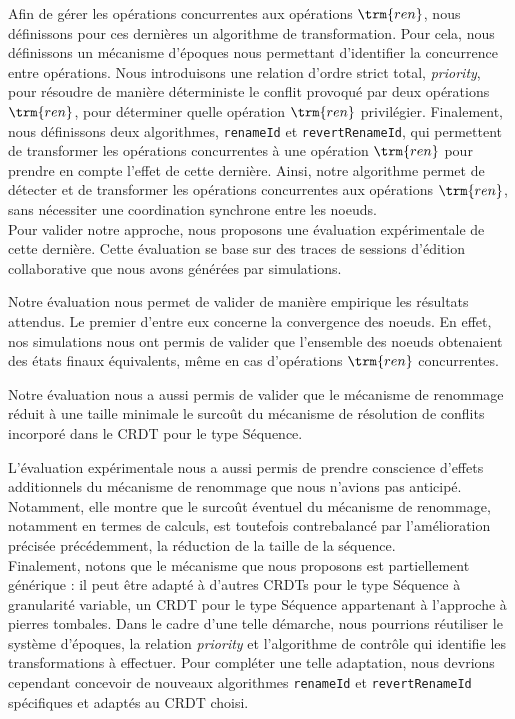 Afin de gérer les opérations concurrentes aux opérations $\trm{ren}$, nous définissons pour ces dernières un algorithme de transformation.
Pour cela, nous définissons un mécanisme d'époques nous permettant d'identifier la concurrence entre opérations.
Nous introduisons une relation d'ordre strict total, \emph{priority}, pour résoudre de manière déterministe le conflit provoqué par deux opérations $\trm{ren}$, \ie pour déterminer quelle opération $\trm{ren}$ privilégier.
Finalement, nous définissons deux algorithmes, \texttt{renameId} et \texttt{revertRenameId}, qui permettent de transformer les opérations concurrentes à une opération $\trm{ren}$ pour prendre en compte l'effet de cette dernière.
Ainsi, notre algorithme permet de détecter et de transformer les opérations concurrentes aux opérations $\trm{ren}$, sans nécessiter une coordination synchrone entre les noeuds.\\


Pour valider notre approche, nous proposons une évaluation expérimentale de cette dernière.
Cette évaluation se base sur des traces de sessions d'édition collaborative que nous avons générées par simulations.

Notre évaluation nous permet de valider de manière empirique les résultats attendus.
Le premier d'entre eux concerne la convergence des noeuds.
En effet, nos simulations nous ont permis de valider que l'ensemble des noeuds obtenaient des états finaux équivalents, même en cas d'opérations $\trm{ren}$ concurrentes.

Notre évaluation nous a aussi permis de valider que le mécanisme de renommage réduit à une taille minimale le surcoût du mécanisme de résolution de conflits incorporé dans le \ac{CRDT} pour le type Séquence.

L'évaluation expérimentale nous a aussi permis de prendre conscience d'effets additionnels du mécanisme de renommage que nous n'avions pas anticipé.
Notamment, elle montre que le surcoût éventuel du mécanisme de renommage, notamment en termes de calculs, est toutefois contrebalancé par l'amélioration précisée précédemment, \ie la réduction de la taille de la séquence.\\

Finalement, notons que le mécanisme que nous proposons est partiellement générique : il peut être adapté à d'autres \acp{CRDT} pour le type Séquence à granularité variable, \eg un \ac{CRDT} pour le type Séquence appartenant à l'approche à pierres tombales.
Dans le cadre d'une telle démarche, nous pourrions réutiliser le système d'époques, la relation \emph{priority} et l'algorithme de contrôle qui identifie les transformations à effectuer.
Pour compléter une telle adaptation, nous devrions cependant concevoir de nouveaux algorithmes \texttt{renameId} et \texttt{revertRenameId} spécifiques et adaptés au \ac{CRDT} choisi.\\

